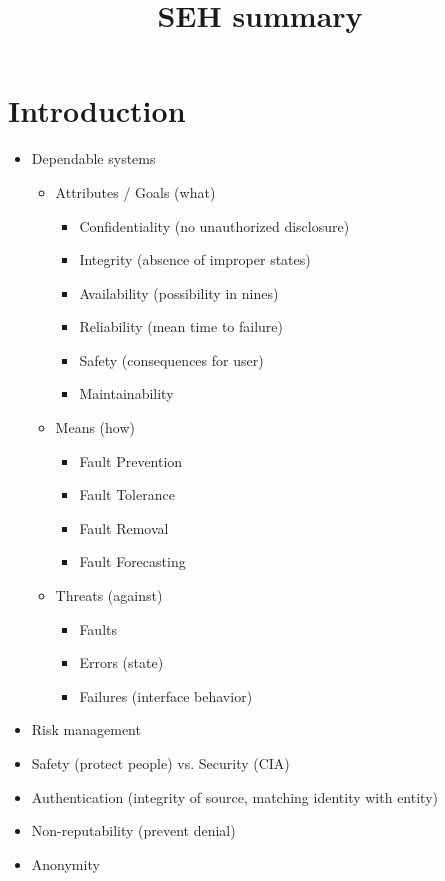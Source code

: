 \documentclass[11pt, paper=a4, twocolumn]{scrartcl}
\title{\vspace{-1.25cm}SEH summary\vspace{-0.25cm}}
\date{\vspace{-5ex}}
\begin{document}
	\maketitle


	\section{Introduction}
		\begin{itemize}
			\item Dependable systems
				\begin{itemize}
					\item Attributes / Goals (what)
						\begin{itemize}
							\item Confidentiality (no unauthorized disclosure)
							\item Integrity (absence of improper states)
							\item Availability (possibility in nines)
							\item Reliability (mean time to failure)
							\item Safety (consequences for user)
							\item Maintainability
						\end{itemize}
					\item Means (how)
						\begin{itemize}
							\item Fault Prevention
							\item Fault Tolerance
							\item Fault Removal
							\item Fault Forecasting
						\end{itemize}
					\item Threats (against)
						\begin{itemize}
							\item Faults
							\item Errors (state)
							\item Failures (interface behavior)
						\end{itemize}
				\end{itemize}
			\item Risk management
			\item Safety (protect people) vs. Security (CIA)
			\item Authentication (integrity of source, matching identity with entity)
			\item Non-reputability (prevent denial)
			\item Anonymity
		\end{itemize}
\end{document}
